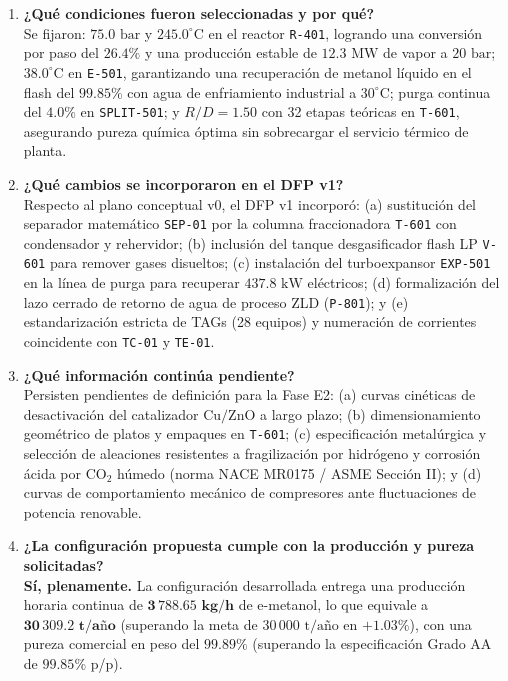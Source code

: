 \documentclass[10pt,letterpaper]{article}
\begin{document}
\begin{enumerate}[leftmargin=*,itemsep=6pt]
    \item \textbf{¿Qué condiciones fueron seleccionadas y por qué?}\\
    Se fijaron: $75.0\text{ bar}$ y $245.0^\circ\text{C}$ en el reactor \texttt{R-401}, logrando una conversión por paso del $26.4\%$ y una producción estable de $12.3\text{ MW}$ de vapor a $20\text{ bar}$; $38.0^\circ\text{C}$ en \texttt{E-501}, garantizando una recuperación de metanol líquido en el flash del $99.85\%$ con agua de enfriamiento industrial a $30^\circ\text{C}$; purga continua del $4.0\%$ en \texttt{SPLIT-501}; y $R/D = 1.50$ con 32 etapas teóricas en \texttt{T-601}, asegurando pureza química óptima sin sobrecargar el servicio térmico de planta.

    \item \textbf{¿Qué cambios se incorporaron en el DFP v1?}\\
    Respecto al plano conceptual v0, el DFP v1 incorporó: (a) sustitución del separador matemático \texttt{SEP-01} por la columna fraccionadora \texttt{T-601} con condensador y rehervidor; (b) inclusión del tanque desgasificador flash LP \texttt{V-601} para remover gases disueltos; (c) instalación del turboexpansor \texttt{EXP-501} en la línea de purga para recuperar $437.8\text{ kW}$ eléctricos; (d) formalización del lazo cerrado de retorno de agua de proceso ZLD (\texttt{P-801}); y (e) estandarización estricta de TAGs (28 equipos) y numeración de corrientes coincidente con \texttt{TC-01} y \texttt{TE-01}.

    \item \textbf{¿Qué información continúa pendiente?}\\
    Persisten pendientes de definición para la Fase E2: (a) curvas cinéticas de desactivación del catalizador $\text{Cu/ZnO}$ a largo plazo; (b) dimensionamiento geométrico de platos y empaques en \texttt{T-601}; (c) especificación metalúrgica y selección de aleaciones resistentes a fragilización por hidrógeno y corrosión ácida por $\text{CO}_2$ húmedo (norma NACE MR0175 / ASME Sección II); y (d) curvas de comportamiento mecánico de compresores ante fluctuaciones de potencia renovable.

    \item \textbf{¿La configuración propuesta cumple con la producción y pureza solicitadas?}\\
    \textbf{Sí, plenamente.} La configuración desarrollada entrega una producción horaria continua de $\mathbf{3\,788.65\text{ kg/h}}$ de e-metanol, lo que equivale a $\mathbf{30\,309.2\text{ t/año}}$ (superando la meta de $30\,000\text{ t/año}$ en $+1.03\%$), con una pureza comercial en peso del $\mathbf{99.89\%}$ (superando la especificación Grado AA de $99.85\%$ p/p).
\end{enumerate}
\end{document}
